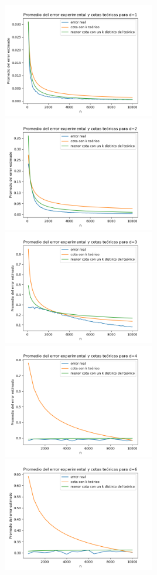 \documentclass[12pt, a4paper]{article}
\begin{document}
\includegraphics[width=0.5\textwidth]{figuras_h=0.1/cotas-error-d=1}
\includegraphics[width=0.5\textwidth]{figuras_h=0.1/cotas-error-d=2}
\includegraphics[width=0.5\textwidth]{figuras_h=0.1/cotas-error-d=3}
\includegraphics[width=0.5\textwidth]{figuras_h=0.1/cotas-error-d=4}
\includegraphics[width=0.5\textwidth]{figuras_h=0.1/cotas-error-d=6}
\end{document}
